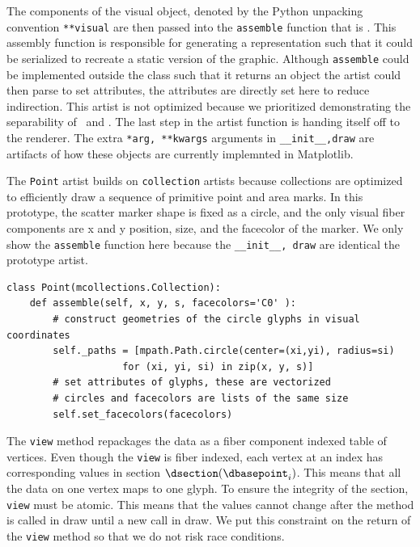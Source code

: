 \documentclass[../main.tex]{subfiles}
\begin{document}
The components of the visual object, denoted by the Python unpacking convention \texttt{**visual} are then passed into the \texttt{assemble} function that is \vmarkd. This assembly function is responsible for generating a representation such that it could be serialized to recreate a static version of the graphic. Although \texttt{assemble} could be implemented outside the class such that it returns an object the artist could then parse to set attributes, the attributes are directly set here to reduce indirection. This artist is not optimized because we prioritized demonstrating the separability of \vchannel\ and \vmarkd. The last step in the artist function is handing itself off to the renderer. The extra \texttt{*arg, **kwargs} arguments in \texttt{__init__,draw} are artifacts of how these objects are currently implemnted in Matplotlib. 

The \texttt{Point} artist builds on \texttt{collection} artists because collections are optimized to efficiently draw a sequence of primitive point and area marks. In this prototype, the scatter marker shape is fixed as a circle, and the only visual fiber components are x and y position, size, and the facecolor of the marker. We only show the \texttt{assemble} function here because the \texttt{__init__, draw} are identical the prototype artist.
\begin{verbatim}
class Point(mcollections.Collection):
    def assemble(self, x, y, s, facecolors='C0' ):
        # construct geometries of the circle glyphs in visual coordinates
        self._paths = [mpath.Path.circle(center=(xi,yi), radius=si) 
                    for (xi, yi, si) in zip(x, y, s)] 
        # set attributes of glyphs, these are vectorized 
        # circles and facecolors are lists of the same size
        self.set_facecolors(facecolors)
\end{verbatim} 
The \texttt{view} method repackages the data as a fiber component indexed table of vertices. Even though the \texttt{view} is fiber indexed, each vertex at an index \dbasepoint has corresponding values in section $\dsection(\dbasepoint_{i})$. This means that all the data on one vertex maps to one glyph. To ensure the integrity of the section, \texttt{view} must be atomic. This means that the values cannot change after the method is called in draw until a new call in draw. We put this constraint on the return of the \texttt{view} method so that we do not risk race conditions. 
\end{document}
